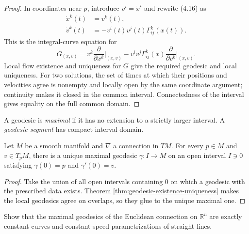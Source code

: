 \begin{proof}
\sketch In coordinates near $p$, introduce $v^i=\dot x^i$ and rewrite (4.16) as
\begin{align}
\dot x^k(t)&=v^k(t),\\
\dot v^k(t)&=-v^i(t)v^j(t)\Gamma^k_{ij}(x(t)). \tag{4.17}
\end{align}
This is the integral-curve equation for
\begin{equation}
G_{(x,v)}=v^k\frac{\partial}{\partial x^k}\bigg|_{(x,v)}
-v^iv^j\Gamma^k_{ij}(x)\frac{\partial}{\partial v^k}\bigg|_{(x,v)}. \tag{4.18}
\end{equation}
Local flow existence and uniqueness for $G$ give the required geodesic and local
uniqueness. For two solutions, the set of times at which their positions and
velocities agree is nonempty and locally open by the same coordinate argument;
continuity makes it closed in the common interval. Connectedness of the interval
gives equality on the full common domain.
\end{proof}

A geodesic is \emph{maximal} if it has no extension to a strictly larger interval.
A \emph{geodesic segment} has compact interval domain.

\begin{corollary}
\label{cor:existence-of-maximal-geodesic}
Let $M$ be a smooth manifold and $\nabla$ a connection in $TM$. For every
$p\in M$ and $v\in T_pM$, there is a unique maximal geodesic
$\gamma\colon I\to M$ on an open interval $I\ni0$ satisfying
$\gamma(0)=p$ and $\gamma'(0)=v$.
\end{corollary}

\begin{proof}
\sketch Take the union of all open intervals containing $0$ on which a geodesic
with the prescribed data exists. Theorem \ref{thm:geodesic-existence-uniqueness}
makes the local geodesics agree on overlaps, so they glue to the unique maximal
one.
\end{proof}

\begin{exercise}
\label{exer:euclidean-geodesics}
Show that the maximal geodesics of the Euclidean connection on $\mathbb R^n$ are
exactly constant curves and constant-speed parametrizations of straight lines.
\end{exercise}

